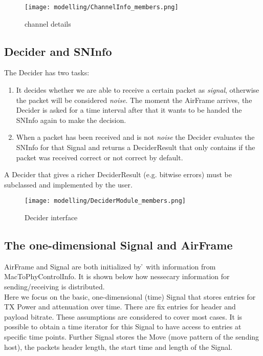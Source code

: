 \begin{figure}[H]
 \centering
 \texttt{[image: modelling/ChannelInfo\_members.png]}
 \caption{channel details}
 \label{fig: channel details}
\end{figure}




\subsection{Decider and SNInfo}
\label{decider}

The Decider has two tasks:
\begin{enumerate}
	\item It decides whether we are able to receive a certain packet as \textit{signal}, otherwise the packet will be considered \textit{noise}. The moment the AirFrame arrives, the Decider is asked for a time interval after that it wants to be handed the SNInfo again to make the decision.
	\item When a packet has been received and is not \textit{noise} the Decider evaluates the SNInfo for that Signal and returns a DeciderResult that only contains if the packet was received correct or not correct by default.
\end{enumerate}

A Decider that gives a richer DeciderResult (e.g. bitwise errors) must be subclassed and implemented by the user.

\begin{figure}[H]
 \centering
 \texttt{[image: modelling/DeciderModule\_members.png]}
 \caption{Decider interface}
 \label{fig: Decider interface}
\end{figure}


\subsection{The one-dimensional Signal and AirFrame}
\label{AirFrame and Signal}

AirFrame and Signal are both initialized by \h{\bp} with information from MacToPhyControlInfo.
It is shown below how nessecary information for sending/receiving is distributed.\\

Here we focus on the basic, one-dimensional (time) Signal that stores entries for TX Power and attenuation over time. There are fix entries for header and payload bitrate. These assumptions are considered to cover most cases.
It is possible to obtain a time iterator for this Signal to have access to entries at specific time points.
Further Signal stores the Move (move pattern of the sending host), the packets header length, the start time and length of the Signal.\\


